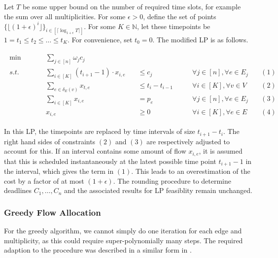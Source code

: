 \documentclass[11pt]{article}
\begin{document}
Let $T$ be some upper bound on the number of required time slots, for example the sum over all multiplicities. For some $\epsilon > 0$, define the set of points $\{\lfloor (1+\epsilon)^i\rfloor\}_{i \in [\lceil \log_{1+\epsilon}T\rceil]}$. For some $K \in \mathbb{N}$, let these timepoints be $1 = t_1 \le t_2 \le \dotsc \le t_K$. For convenience, set $t_0 = 0$. The modified LP is as follows.

\begin{gather*}\label{lp:deadlinespoly}\tag{LP D'}
\begin{aligned}
\min\qquad &&\sum_{j \in [n]} \omega_jc_j  &~&&~\\
s.t.\qquad &&\sum_{i \in [K]}(t_{i+1}-1)\cdot x_{i,e} &\quad\le c_j \qquad&\forall j \in [n], \forall e \in E_j&& (1)\\
~&&\sum_{e \in \delta_E(v)}x_{t,e} &\quad\le t_i - t_{i-1}\qquad &\forall i \in [K],\forall v \in V && (2)\\
~&&\sum_{i \in [K]} x_{i,e} &\quad= p_e\qquad &\forall j \in [n], \forall e \in E_j && (3)\\
~&&x_{i,e} &\quad\ge 0\qquad &\forall i \in [K], \forall e \in E && (4)
\end{aligned}
\end{gather*}

In this LP, the timepoints are replaced by time intervals of size $t_{i+1} - t_i$. The right hand sides of constraints $(2)$ and $(3)$ are respectively adjusted to account for this. If an interval contains some amount of flow $x_{i,e}$, it is assumed that this is scheduled instantaneously at the latest possible time point $t_{i+1}-1$ in the interval, which gives the term in $(1)$. This leads to an overestimation of the cost by a factor of at most $(1+\epsilon)$. The rounding procedure to determine deadlines $C_1,\dotsc,C_n$ and the associated results for LP feasiblity remain unchanged.

\subsubsection*{Greedy Flow Allocation}

For the greedy algorithm, we cannot simply do one iteration for each edge and multiplicity, as this could require super-polynomially many steps. The required adaption to the procedure was described in a similar form in \cite{zhen_2015}.\\
\end{document}
